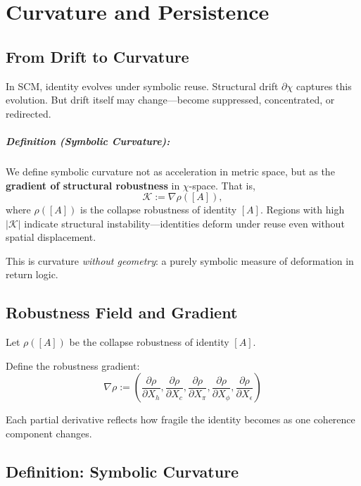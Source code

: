 \chapter{Curvature and Persistence}

\section{From Drift to Curvature}

In SCM, identity evolves under symbolic reuse. Structural drift $\partial\chi$ captures this evolution. But drift itself may change—become suppressed, concentrated, or redirected.

\paragraph{Definition (Symbolic Curvature):}
We define symbolic curvature not as acceleration in metric space, but as the \textbf{gradient of structural robustness} in $\chi$-space. That is,
\[
\mathcal{K} := \nabla \rho([A]),
\]
where $\rho([A])$ is the collapse robustness of identity $[A]$. Regions with high $|\mathcal{K}|$ indicate structural instability—identities deform under reuse even without spatial displacement.

\noindent This is curvature \emph{without geometry}: a purely symbolic measure of deformation in return logic.

\section{Robustness Field and Gradient}

Let $\rho([A])$ be the collapse robustness of identity $[A]$.

Define the robustness gradient:
\begin{equation} \label{eq:robustness-gradient}
\nabla \rho := \left( \frac{\partial \rho}{\partial X_h}, \frac{\partial \rho}{\partial X_c}, \frac{\partial \rho}{\partial X_\pi}, \frac{\partial \rho}{\partial X_\phi}, \frac{\partial \rho}{\partial X_\epsilon} \right)
\end{equation}

Each partial derivative reflects how fragile the identity becomes as one coherence component changes.

\section{Definition: Symbolic Curvature}

